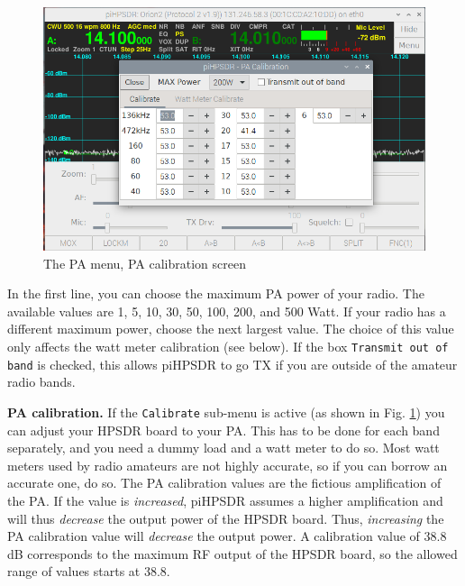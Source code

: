 \documentclass[12pt]{book}
\def\rett#1{\texttt{\color{red}#1}}
\begin{document}
\begin{figure}[ht]
\center
\includegraphics[width=12cm]{PAMenuCalibrate.png}
\caption{The PA menu, PA calibration screen}
\label{fig:PAMenuCalibrate}
\end{figure}

In the first line, you can choose the maximum PA power of your
radio. The available values are 1, 5, 10, 30, 50, 100, 200, and
500 Watt. If your radio has a different maximum power, choose the
next largest value. The choice of this value only affects the
watt meter calibration (see below). If the  box
\rett{Transmit out of band} is checked, this allows piHPSDR
to go TX if you are outside of the amateur radio bands.



\textbf{PA calibration.} If the \rett{Calibrate} sub-menu is active
(as shown in Fig. \ref{fig:PAMenuCalibrate}) you can adjust your
HPSDR board to your PA. This has to be done for each band separately,
and you need a dummy load and a watt meter to do so. Most watt meters
used by radio amateurs are not highly accurate, so if you can borrow
an accurate one, do so. The PA calibration values are the fictious
amplification of the PA. If the value is \textit{increased},
piHPSDR assumes a higher amplification and will thus \textit{decrease}
the output power of the HPSDR board. Thus, \textit{increasing} the
PA calibration value will \textit{decrease} the output power. A calibration
value of 38.8 dB corresponds to the maximum RF output of the HPSDR board,
so the allowed range of values starts at 38.8.
\end{document}
